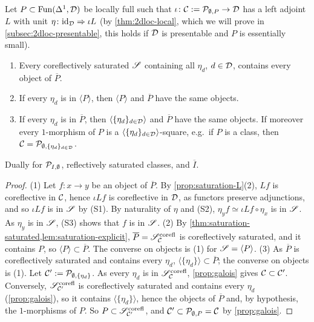\begin{thm}
\label{thm:sat-units}
%
Let
$P \subset \operatorname{Fun}(\Delta^{1},\mathcal{D})$
be locally full such that
$\iota\colon \mathcal{C} := \mathcal{P}_{\emptyset,P} \to \mathcal{D}$
has a left adjoint $L$ with unit
$\eta\colon \mathrm{id}_{\mathcal{D}} \Rightarrow \iota L$
(by \cref{thm:2dloc-local}, which we will prove in
\cref{subsec:2dloc-presentable}, this holds if $\mathcal{D}$ is presentable and $P$ is
essentially small).
\begin{enumerate}
\item Every coreflectively saturated $\mathscr{S}$ containing all $\eta_{d}$,
$d \in \mathcal{D}$, contains every object of $\overline{P}$.
\item If every $\eta_{d}$ is in $\langle P \rangle$,
then $\langle P \rangle$ and $\overline{P}$ have the same objects.
\item If every $\eta_{d}$ is in $\overline{P}$, then
$\langle \{\eta_{d}\}_{d \in \mathcal{D}} \rangle$
and $\overline{P}$ have the same objects.
If moreover every $1$-morphism of $P$ is a
$\langle \{\eta_{d}\}_{d \in \mathcal{D}} \rangle$-square,
e.g.\ if $P$ is a class, then
$\mathcal{C} = \mathcal{P}_{\emptyset,\{\eta_{d}\}_{d \in \mathcal{D}}}$.
\end{enumerate}
Dually for $\mathcal{P}_{I,\emptyset}$, reflectively saturated classes,
and $\overline{I}$.
\end{thm}

\begin{proof}
%
(1) Let $f\colon x \to y$ be an object of $\overline{P}$.
By \cref{prop:saturation-L}(2), $Lf$ is coreflective in $\mathcal{C}$,
hence $\iota Lf$ is coreflective in $\mathcal{D}$, as functors preserve adjunctions,
and so $\iota Lf$ is in $\mathscr{S}$ by (S1). By naturality of $\eta$ and (S2),
$\eta_{y}f \simeq \iota Lf \circ \eta_{x}$
is in $\mathscr{S}$. As $\eta_{y}$ is in $\mathscr{S}$, (S3) shows that $f$ is in $\mathscr{S}$.
(2) By \cref{thm:saturation-saturated,lem:saturation-explicit},
$\overline{P} = \mathscr{S}^{\mathrm{corefl}}_{\mathcal{C}}$
is coreflectively saturated, and it contains $P$, so
$\langle P \rangle \subset \overline{P}$.
The converse on objects is (1) for
$\mathscr{S} = \langle P \rangle$.
(3) As $\overline{P}$ is coreflectively saturated and contains every $\eta_{d}$,
$\langle \{\eta_{d}\} \rangle \subset \overline{P}$;
the converse on objects is (1). Let
$\mathcal{C}' := \mathcal{P}_{\emptyset,\{\eta_{d}\}}$.
As every $\eta_{d}$ is in
$\mathscr{S}^{\mathrm{corefl}}_{\mathcal{C}}$,
\cref{prop:galois} gives $\mathcal{C} \subset \mathcal{C}'$. Conversely,
$\mathscr{S}^{\mathrm{corefl}}_{\mathcal{C}'}$
is coreflectively saturated and contains every $\eta_{d}$ (\cref{prop:galois}),
so it contains
$\langle \{\eta_{d}\} \rangle$,
hence the objects of $\overline{P}$ and, by hypothesis,
the $1$-morphisms of $P$. So
$P \subset \mathscr{S}^{\mathrm{corefl}}_{\mathcal{C}'}$,
and
$\mathcal{C}' \subset \mathcal{P}_{\emptyset,P} = \mathcal{C}$
by \cref{prop:galois}.
\end{proof}

